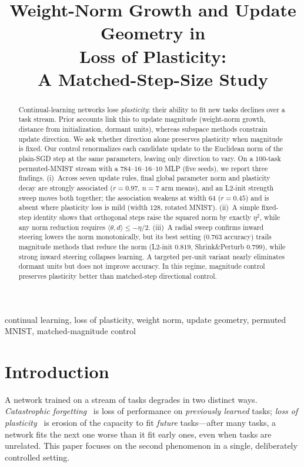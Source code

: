 \documentclass[conference]{IEEEtran}
\begin{document}
\title{Weight-Norm Growth and Update Geometry in\\
Loss of Plasticity:\\
A Matched-Step-Size Study}

\author{
}

\maketitle

\begin{abstract}
Continual-learning networks lose \emph{plasticity}: their ability to fit new
tasks declines over a task stream. Prior accounts link this to update magnitude
(weight-norm growth, distance from initialization, dormant units), whereas subspace
methods constrain update direction. We ask whether direction alone preserves
plasticity when magnitude is fixed. Our control renormalizes each candidate update
to the Euclidean norm of the plain-SGD step at the same parameters, leaving only
direction to vary. On a $100$-task permuted-MNIST stream with a
$784$--$16$--$16$--$10$ MLP (five seeds), we report three findings.
(i)~Across seven update rules, final global parameter norm and plasticity decay are
strongly associated ($r{=}0.97$, $n{=}7$ arm means), and an L2-init strength sweep
moves both together; the association weakens at width $64$ ($r{=}0.45$) and is
absent where plasticity loss is mild (width $128$, rotated MNIST). (ii)~A simple
fixed-step identity shows that orthogonal steps raise the squared norm by exactly
$\eta^{2}$, while any norm reduction requires
$\langle\theta,d\rangle\le-\eta/2$. (iii)~A radial sweep confirms inward
steering lowers the norm monotonically, but its best setting ($0.763$ accuracy)
trails magnitude methods that reduce the norm (L2-init $0.819$, Shrink\&Perturb $0.799$),
while strong inward steering collapses learning. A targeted per-unit variant nearly
eliminates dormant units but does not improve accuracy. In this regime, magnitude
control preserves plasticity better than matched-step directional control.
\end{abstract}

\begin{IEEEkeywords}
continual learning, loss of plasticity, weight norm, update geometry, permuted
MNIST, matched-magnitude control
\end{IEEEkeywords}

\section{Introduction}
A network trained on a stream of tasks degrades in two distinct ways.
\emph{Catastrophic forgetting}~\cite{mccloskey1989,goodfellow2013}
is loss of performance on \emph{previously learned} tasks; \emph{loss of
plasticity}~\cite{dohare2024,lyle2023,abbas2023} is erosion of the capacity
to fit \emph{future} tasks---after many tasks, a network fits the next one worse
than it fit early ones, even when tasks are unrelated. This paper focuses on the
second phenomenon in a single, deliberately controlled setting.
\end{document}
